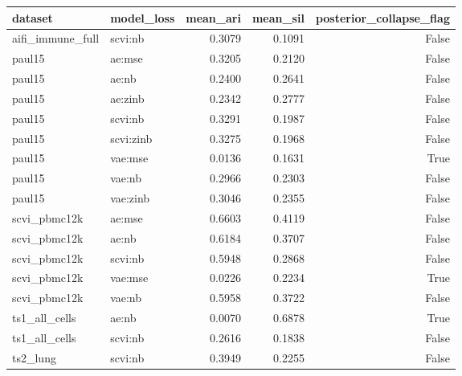 \begin{tabular}{llrrr}
\toprule
dataset & model\_loss & mean\_ari & mean\_sil & posterior\_collapse\_flag \\
\midrule
aifi\_immune\_full & scvi:nb & 0.3079 & 0.1091 & False \\
paul15 & ae:mse & 0.3205 & 0.2120 & False \\
paul15 & ae:nb & 0.2400 & 0.2641 & False \\
paul15 & ae:zinb & 0.2342 & 0.2777 & False \\
paul15 & scvi:nb & 0.3291 & 0.1987 & False \\
paul15 & scvi:zinb & 0.3275 & 0.1968 & False \\
paul15 & vae:mse & 0.0136 & 0.1631 & True \\
paul15 & vae:nb & 0.2966 & 0.2303 & False \\
paul15 & vae:zinb & 0.3046 & 0.2355 & False \\
scvi\_pbmc12k & ae:mse & 0.6603 & 0.4119 & False \\
scvi\_pbmc12k & ae:nb & 0.6184 & 0.3707 & False \\
scvi\_pbmc12k & scvi:nb & 0.5948 & 0.2868 & False \\
scvi\_pbmc12k & vae:mse & 0.0226 & 0.2234 & True \\
scvi\_pbmc12k & vae:nb & 0.5958 & 0.3722 & False \\
ts1\_all\_cells & ae:nb & 0.0070 & 0.6878 & True \\
ts1\_all\_cells & scvi:nb & 0.2616 & 0.1838 & False \\
ts2\_lung & scvi:nb & 0.3949 & 0.2255 & False \\
\bottomrule
\end{tabular}
